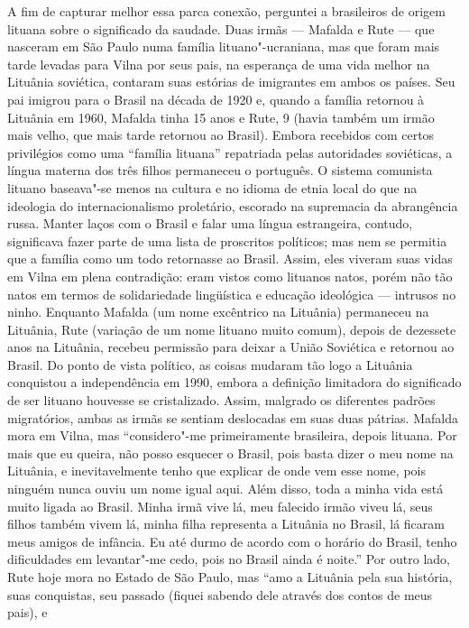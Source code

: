 A fim de capturar melhor essa parca conexão, perguntei a brasileiros de
origem lituana sobre o significado da saudade. Duas irmãs --- Mafalda e
Rute --- que nasceram em São Paulo numa família lituano"-ucraniana, mas que
foram mais tarde levadas para Vilna por seus pais, na esperança de uma
vida melhor na Lituânia soviética, contaram suas estórias de imigrantes
em ambos os países. Seu pai imigrou para o Brasil na década de 1920 e,
quando a família retornou à Lituânia em 1960, Mafalda tinha 15 anos e
Rute, 9 (havia também um irmão mais velho, que mais tarde retornou ao
Brasil). Embora recebidos com certos privilégios como uma ``família
lituana'' repatriada pelas autoridades soviéticas, a língua materna dos
três filhos permaneceu o português. O sistema comunista lituano
baseava"-se menos na cultura e no idioma de etnia local do que na
ideologia do internacionalismo proletário, escorado na supremacia da
abrangência russa. Manter laços com o Brasil e falar uma língua
estrangeira, contudo, significava fazer parte de uma lista de proscritos
políticos; mas nem se permitia que a família como um todo retornasse ao
Brasil. Assim, eles viveram suas vidas em Vilna em plena contradição:
eram vistos como lituanos natos, porém não tão natos em termos de
solidariedade lingüística e educação ideológica --- intrusos no ninho.
Enquanto Mafalda (um nome excêntrico na Lituânia) permaneceu na
Lituânia, Rute (variação de um nome lituano muito comum), depois de
dezessete anos na Lituânia, recebeu permissão para deixar a União
Soviética e retornou ao Brasil. Do ponto de vista político, as coisas
mudaram tão logo a Lituânia conquistou a independência em 1990, embora a
definição limitadora do significado de ser lituano houvesse se
cristalizado. Assim, malgrado os diferentes padrões migratórios, ambas
as irmãs se sentiam deslocadas em suas duas pátrias. Mafalda mora em
Vilna, mas ``considero"-me primeiramente brasileira, depois lituana. Por
mais que eu queira, não posso esquecer o Brasil, pois basta dizer o meu
nome na Lituânia, e inevitavelmente tenho que explicar de onde vem esse
nome, pois ninguém nunca ouviu um nome igual aqui. Além disso, toda a
minha vida está muito ligada ao Brasil. Minha irmã vive lá, meu falecido
irmão viveu lá, seus filhos também vivem lá, minha filha representa a
Lituânia no Brasil, lá ficaram meus amigos de infância. Eu até durmo de
acordo com o horário do Brasil, tenho dificuldades em levantar"-me cedo,
pois no Brasil ainda é noite.'' Por outro lado, Rute hoje mora no Estado
de São Paulo, mas ``amo a Lituânia pela sua história, suas conquistas,
seu passado (fiquei sabendo dele através dos contos de meus pais), e
